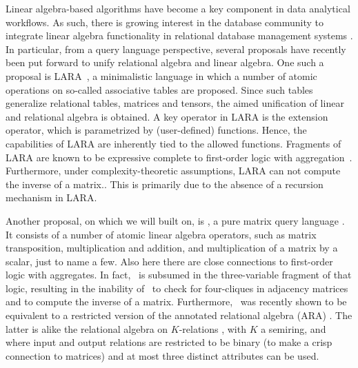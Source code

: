 
%
Linear algebra-based algorithms have become a key component in data analytical workflows. As such, there is growing interest in the database community to integrate linear algebra functionality in relational database management systems \cite{}. In particular, from a query language perspective, several proposals have recently been put forward to unify relational algebra and linear algebra. One such a proposal is LARA~\cite{}, a minimalistic language in which a number of atomic operations on so-called associative tables are proposed. Since such tables generalize relational tables, matrices and tensors, the aimed unification of linear and relational algebra is obtained. A key operator in LARA is the extension operator, which is parametrized by (user-defined) functions. Hence, the capabilities of LARA are inherently tied to the allowed functions. Fragments of LARA are known to be expressive complete to first-order logic with aggregation~\cite{}. Furthermore, under complexity-theoretic assumptions, LARA can not compute the inverse of a matrix.\cite{}. This is primarily due to the absence of a recursion mechanism in LARA. 


Another proposal, on which we will built on, is \lang, a pure matrix query language \cite{}. It consists of a number of atomic linear algebra operators, such as matrix transposition, multiplication and addition, and multiplication of a matrix by a scalar, just to name a few. Also here there are close connections to first-order logic with aggregates. In fact, \lang\ is subsumed in the three-variable fragment of that logic, resulting in the inability of \lang\ to check for four-cliques in adjacency matrices and to compute the inverse of a matrix. Furthermore, \lang\ was recently shown to be equivalent to a restricted version of the annotated relational algebra (ARA) \cite{}. The latter is alike the relational algebra on $K$-relations \cite{}, with $K$ a semiring, and  where input and output relations are restricted to be binary (to make a crisp connection to matrices) and at most three distinct attributes can be used. 

